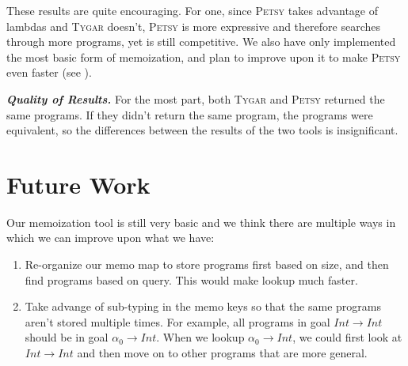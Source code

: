 \documentclass[acmsmall,nonacm]{acmart}
\begin{document}
These results are quite encouraging. For one, since \textsc{Petsy} takes advantage of 
lambdas and \textsc{Tygar} doesn't, \textsc{Petsy} is more expressive and therefore searches through 
more programs, yet is still competitive. We also have only implemented the most
basic form of memoization, and plan to improve upon it to make \textsc{Petsy} even
faster (see ).

\vspace{2mm}
\noindent \textbf{\textit{Quality of Results.}} For the most part, both \textsc{Tygar} 
and \textsc{Petsy} returned the same programs. If they didn't return the same program,
the programs were equivalent, so the differences between the results of the two
tools is insignificant. 

\section{Future Work}
\label{future}

Our memoization tool is still very basic and we think there are multiple ways in
which we can improve upon what we have:

\begin{enumerate}
  \item Re-organize our memo map to store programs first based on size, and then 
        find programs based on query. This would make lookup much faster.
  \item Take advange of sub-typing in the memo keys so that the same programs
        aren't stored multiple times. For example, all programs in goal 
        $Int \to Int$ should be in goal $\alpha_0 \to Int$. When
        we lookup $\alpha_0 \to Int$, we could first look at $Int \to Int$
        and then move on to other programs that are more general.
\end{enumerate}


 
\end{document}
